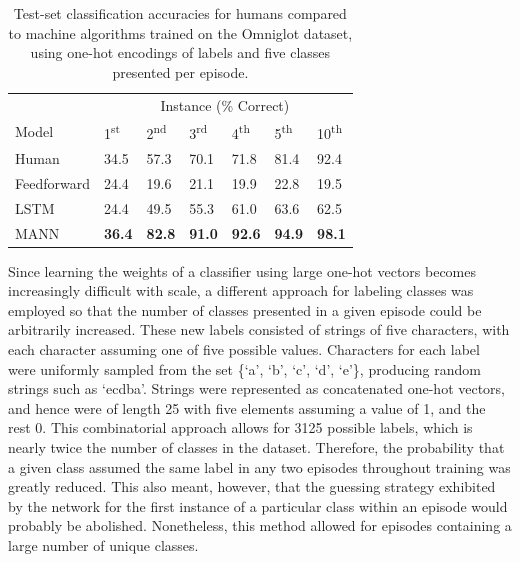 \documentclass{article}
\begin{document}
\begin{table}[t]
\caption{Test-set classification accuracies for humans compared to machine algorithms trained on the Omniglot dataset, using one-hot encodings of labels and five classes presented per episode.}
\label{omniglot-test--1hot-table}
\vskip 0.15in
\begin{center}
\begin{small}
\begin{sc}
\begin{tabular}{l|p{5mm}p{5mm}p{5mm}p{5mm}p{5mm}p{5mm}}
\hline
& \multicolumn{6}{c}{Instance (\% Correct)} \\
Model & 1\textsuperscript{st} & 2\textsuperscript{nd} & 3\textsuperscript{rd} & 4\textsuperscript{th} & 5\textsuperscript{th} & 10\textsuperscript{th} \\
\hline
\abovespace
Human       & 34.5  & 57.3  & 70.1  & 71.8  & 81.4  & 92.4  \\
Feedforward & 24.4  & 19.6  & 21.1  & 19.9  & 22.8  & 19.5  \\
LSTM        & 24.4  & 49.5  & 55.3  & 61.0  & 63.6  & 62.5  \\
MANN         & \textbf{36.4}  & \textbf{82.8}  & \textbf{91.0}  & \textbf{92.6}  & \textbf{94.9}  & \textbf{98.1}  \\
\hline
\end{tabular}
\end{sc}
\end{small}
\end{center}
\vskip -0.1in
\end{table}

Since learning the weights of a classifier using large one-hot vectors becomes increasingly difficult with scale, a different approach for labeling classes was employed so that the number of classes presented in a given episode could be arbitrarily increased. These new labels consisted of strings of five characters, with each character assuming one of five possible values. Characters for each label were uniformly sampled from the set \{`a', `b', `c', `d', `e'\}, producing random strings such as `ecdba'. Strings were represented as concatenated one-hot vectors, and hence were of length 25 with five elements assuming a value of 1, and the rest 0. This combinatorial approach allows for 3125 possible labels, which is nearly twice the number of classes in the dataset. Therefore, the probability that a given class assumed the same label in any two episodes throughout training was greatly reduced. This also meant, however, that the guessing strategy exhibited by the network for the first instance of a particular class within an episode would probably be abolished. Nonetheless, this method allowed for episodes containing a large number of unique classes.
\end{document}
